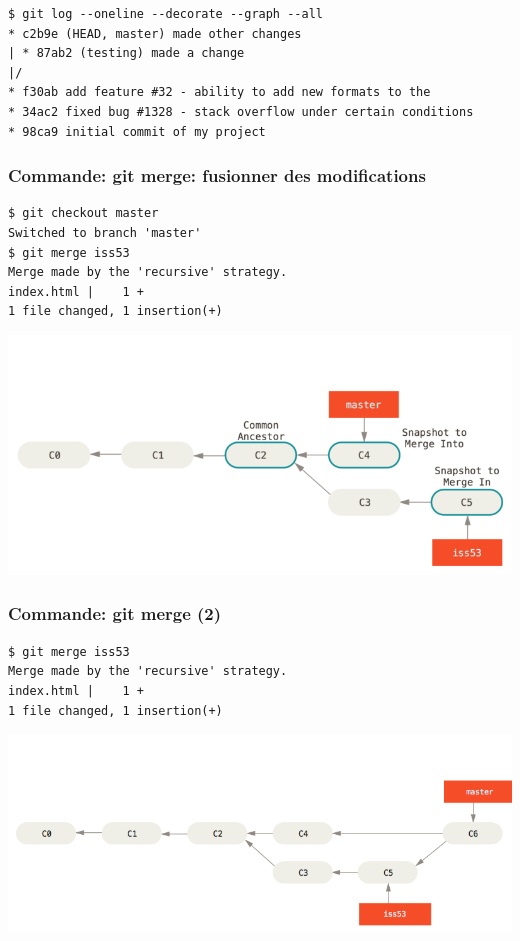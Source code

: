 \documentclass{beamer}
\begin{document}
\begin{frame}[fragile]
\begin{lstlisting}
$ git log --oneline --decorate --graph --all
* c2b9e (HEAD, master) made other changes
| * 87ab2 (testing) made a change
|/
* f30ab add feature #32 - ability to add new formats to the
* 34ac2 fixed bug #1328 - stack overflow under certain conditions
* 98ca9 initial commit of my project
\end{lstlisting}
\end{frame}

\begin{frame}[fragile]
    \frametitle{Commande: git merge: fusionner des modifications}
\begin{lstlisting}
$ git checkout master
Switched to branch 'master'
$ git merge iss53
Merge made by the 'recursive' strategy.
index.html |    1 +
1 file changed, 1 insertion(+)
\end{lstlisting}
\begin{center}
    \includegraphics[width=\textwidth,trim=0 0 0 40, clip]{img/basic-merging-1.png}
\end{center}
\end{frame}

\begin{frame}[fragile]
    \frametitle{Commande: git merge (2)}
\begin{lstlisting}
$ git merge iss53
Merge made by the 'recursive' strategy.
index.html |    1 +
1 file changed, 1 insertion(+)
\end{lstlisting}
\begin{center}
    \includegraphics[width=\textwidth,trim=0 0 0 40, clip]{img/basic-merging-2.png}
\end{center}
\end{frame}
\end{document}
